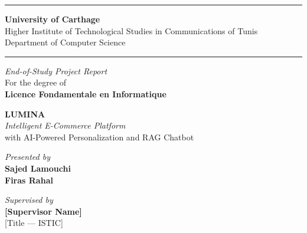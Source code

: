 \begin{titlepage}
\centering

\noindent\rule{\textwidth}{1.5pt}
\vspace{0.4cm}

{\large\textbf{University of Carthage}}\\[4pt]
{\large Higher Institute of Technological Studies in Communications of Tunis}\\[4pt]
{\normalsize Department of Computer Science}

\vspace{0.5cm}
\noindent\rule{\textwidth}{0.5pt}
\vspace{1.2cm}

{\large\itshape End-of-Study Project Report}\\[6pt]
{\normalsize For the degree of}\\[6pt]
{\large\textbf{Licence Fondamentale en Informatique}}

\vspace{1.5cm}

\begin{tcolorbox}[
  colback=primaryblue!8,
  colframe=primaryblue,
  boxrule=1.5pt,
  arc=4pt,
  left=12pt, right=12pt, top=10pt, bottom=10pt
]
  \centering
  {\Huge\bfseries\color{primaryblue} LUMINA}\\[10pt]
  {\large\itshape Intelligent E-Commerce Platform}\\[6pt]
  {\normalsize with AI-Powered Personalization and RAG Chatbot}
\end{tcolorbox}

\vspace{2cm}

\begin{minipage}{0.45\textwidth}
  \centering
  {\small\textit{Presented by}}\\[6pt]
  {\large\textbf{Sajed Lamouchi}}\\[4pt]
  {\large\textbf{Firas Rahal}}
\end{minipage}
\hfill
\begin{minipage}{0.45\textwidth}
  \centering
  {\small\textit{Supervised by}}\\[6pt]
  {\large\textbf{[Supervisor Name]}}\\[4pt]
  {\normalsize [Title --- ISTIC]}
\end{minipage}


\end{titlepage}
